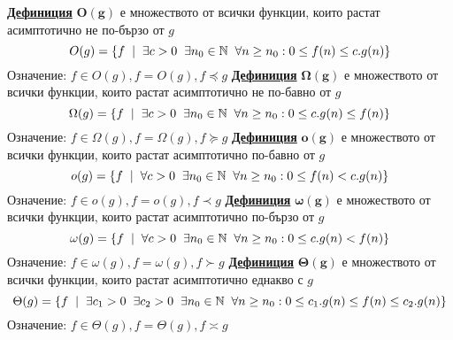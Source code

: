\documentclass{article}
\begin{document}
\textbf{\underline{Дефиниция}}
$\mathbf{O(g)}$ е множеството от всички функции, които растат асимптотично не по-бързо от $g$
$$O(g) = \{f \hspace{0.2cm} | \hspace{0.2cm} \exists c > 0 \hspace{0.2cm} \exists n_0 \in \mathbb{N} \hspace{0.2cm}
\forall n \ge n_0 : 0 \le f(n) \le c.g(n)\}$$ Означение: $f \in O(g), f = O(g), f \preceq g$ \newline\newline
\textbf{\underline{Дефиниция}}
$\mathbf{\Omega(g)}$ е множеството от всички функции, които растат асимптотично не по-бавно от $g$
$$\Omega(g) = \{f \hspace{0.2cm} | \hspace{0.2cm} \exists c > 0 \hspace{0.2cm} \exists n_0 \in \mathbb{N} \hspace{0.2cm}
\forall n \ge n_0 : 0 \le c.g(n) \le f(n)\}$$ Означение: $f \in \Omega(g), f = \Omega(g), f \succeq g$ \newline\newline
\textbf{\underline{Дефиниция}}
$\mathbf{o(g)}$ е множеството от всички функции, които растат асимптотично по-бавно от $g$
$$o(g) = \{f \hspace{0.2cm} | \hspace{0.2cm} \forall c > 0 \hspace{0.2cm} \exists n_0 \in \mathbb{N} \hspace{0.2cm}
\forall n \ge n_0 : 0 \le f(n) < c.g(n)\}$$ Означение: $f \in o(g), f = o(g), f \prec g$ \newline\newline
\textbf{\underline{Дефиниция}}
$\mathbf{\omega(g)}$ е множеството от всички функции, които растат асимптотично по-бързо от $g$
$$\omega(g) = \{f \hspace{0.2cm} | \hspace{0.2cm} \forall c > 0 \hspace{0.2cm} \exists n_0 \in \mathbb{N} \hspace{0.2cm}
\forall n \ge n_0 : 0 \le c.g(n) < f(n)\}$$ Означение: $f \in \omega(g), f = \omega(g), f \succ g$ \newline\newline
\textbf{\underline{Дефиниция}}
$\mathbf{\Theta(g)}$ е множеството от всички функции, които растат асимптотично еднакво с $g$
$$\Theta(g) = \{f \hspace{0.2cm} | \hspace{0.2cm} \exists c_1 > 0 \hspace{0.2cm} \exists c_2 > 0 \hspace{0.2cm} \exists n_0
\in \mathbb{N} \hspace{0.2cm} \forall n \ge n_0 : 0 \le c_1.g(n) \le f(n) \le c_2.g(n)\}$$ Означение: $f \in \Theta(g),
f = \Theta(g), f \asymp g$ \newline\newline
\end{document}
